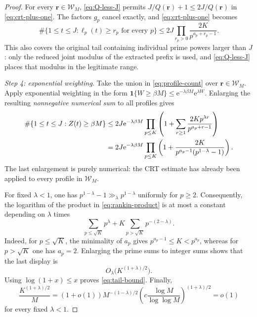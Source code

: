 \documentclass[11pt]{article}
\theoremstyle{remark}
\newcommand{\ind}{\mathbf 1}
\newcommand{\e}{\mathrm e}
\begin{document}
\begin{proof}
For every \(\mathbf r\in\mathcal W_M\), \eqref{eq:Q-less-J} permits
\(J/Q(\mathbf r)+1\leq2J/Q(\mathbf r)\) in
\eqref{eq:crt-plus-one}.  The factors
\(g_p\) cancel exactly, and \eqref{eq:crt-plus-one} becomes
\begin{equation}\label{eq:profile-count}
 \#\{1\leq t\leq J:\ell_p(t)\geq r_p\text{ for every }p\}
 \leq
 2J\prod_{r_p>0}\frac{2K}{p^{a_p+r_p-1}}.
\end{equation}
This also covers the original tail containing individual prime powers larger
than \(J\): only the reduced joint modulus of the extracted prefix is used,
and \eqref{eq:Q-less-J} places that modulus in the legitimate range.

\medskip
\noindent\emph{Step 4: exponential weighting.}
Take the union in \eqref{eq:profile-count} over
\(\mathbf r\in\mathcal W_M\).  Apply exponential weighting in the form
\(\ind\{W\geq\beta M\}\leq
\e^{-\lambda\beta M}\e^{\lambda W}\).  Enlarging the resulting
\emph{nonnegative numerical sum} to all profiles gives
\begin{align}
 \#\{1\leq t\leq J:Z(t)\geq\beta M\}
 &\leq2J\e^{-\lambda\beta M}
 \prod_{p\leq K}
 \left(1+\sum_{r\geq1}
   \frac{2Kp^{\lambda r}}{p^{a_p+r-1}}\right)\notag\\
 &=2J\e^{-\lambda\beta M}
 \prod_{p\leq K}
 \left(1+
   \frac{2K}{p^{a_p-1}(p^{1-\lambda}-1)}\right).
 \label{eq:rankin-product}
\end{align}
The last enlargement is purely numerical: the CRT estimate has already been
applied to every profile in \(\mathcal W_M\).

For fixed \(\lambda<1\), one has
\(p^{1-\lambda}-1\gg_\lambda p^{1-\lambda}\) uniformly for \(p\geq2\).
Consequently, the logarithm of the product in
\eqref{eq:rankin-product} is at most a constant depending on \(\lambda\)
times
\[
 \sum_{p\leq\sqrt K}p^\lambda
 +K\sum_{p>\sqrt K}p^{-(2-\lambda)}.
\]
Indeed, for \(p\leq\sqrt K\), the minimality of \(a_p\) gives
\(p^{a_p-1}\leq K<p^{a_p}\), whereas for \(p>\sqrt K\) one has
\(a_p=2\).  Enlarging the prime sums to integer sums shows that the last
display is
\begin{equation}\label{eq:euler-error}
 O_\lambda\bigl(K^{(1+\lambda)/2}\bigr).
\end{equation}
Using \(\log(1+x)\leq x\) proves \eqref{eq:tail-bound}.
Finally,
\[
 \frac{K^{(1+\lambda)/2}}M
 =(1+o(1))M^{-(1-\lambda)/2}
  \left(c\frac{\log M}{\log\log M}\right)^{(1+\lambda)/2}
 =o(1)
\]
for every fixed \(\lambda<1\).
\end{proof}
\end{document}
